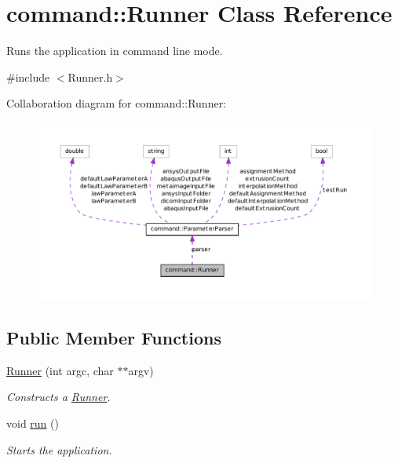 \hypertarget{classcommand_1_1_runner}{
\section{command::Runner Class Reference}
\label{classcommand_1_1_runner}
}


Runs the application in command line mode.  




{\ttfamily \#include $<$Runner.h$>$}



Collaboration diagram for command::Runner:\nopagebreak
\begin{figure}[H]
\begin{center}
\leavevmode
\includegraphics[width=400pt]{classcommand_1_1_runner__coll__graph}
\end{center}
\end{figure}
\subsection*{Public Member Functions}
\begin{DoxyCompactItemize}
\item 
\hyperlink{classcommand_1_1_runner_afe9efc7e2b8ba3ffd9dce513342f0a46}{Runner} (int argc, char $\ast$$\ast$argv)
\begin{DoxyCompactList}\small\item\em Constructs a \hyperlink{classcommand_1_1_runner}{Runner}. \item\end{DoxyCompactList}\item 
\hypertarget{classcommand_1_1_runner_a0d91edb3156141b1ff1a4ff7086a9711}{
void \hyperlink{classcommand_1_1_runner_a0d91edb3156141b1ff1a4ff7086a9711}{run} ()}
\label{classcommand_1_1_runner_a0d91edb3156141b1ff1a4ff7086a9711}

\begin{DoxyCompactList}\small\item\em Starts the application. \item\end{DoxyCompactList}\end{DoxyCompactItemize}
